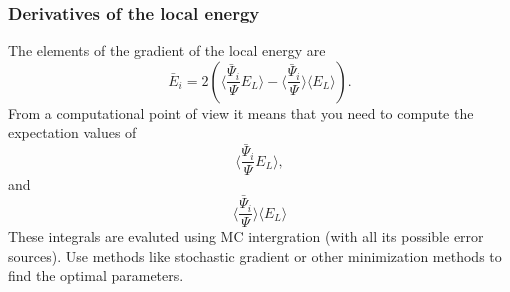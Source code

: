 \documentclass{beamer}
\begin{document}
\begin{frame}
\frametitle{Derivatives of the local energy}

\begin{block}{}
The elements of the gradient of the local energy are 
\[
\bar{E}_{i}= 2\left( \langle \frac{\bar{\Psi}_{i}}{\Psi}E_L\rangle -\langle \frac{\bar{\Psi}_{i}}{\Psi}\rangle\langle E_L \rangle\right).
\]
From a computational point of view it means that you need to compute the expectation values of 
\[
\langle \frac{\bar{\Psi}_{i}}{\Psi}E_L\rangle,
\]
and
\[
\langle \frac{\bar{\Psi}_{i}}{\Psi}\rangle\langle E_L\rangle
\]
These integrals are evaluted using MC intergration (with all its possible error sources). Use methods like stochastic gradient or other minimization methods to find the optimal parameters.
\end{block}
\end{frame}
\end{document}
